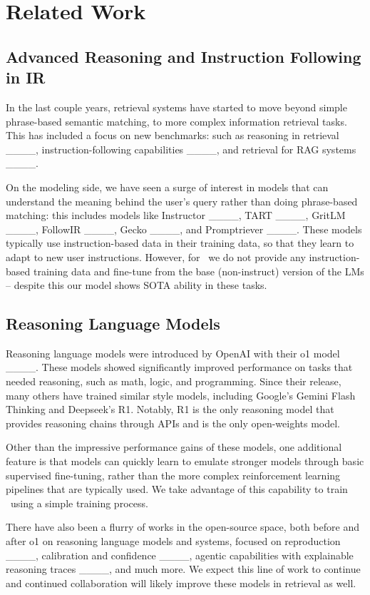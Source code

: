 \section{Related Work}
\subsection{Advanced Reasoning and Instruction Following in IR}
In the last couple years, retrieval systems have started to move beyond simple phrase-based semantic matching, to more complex information retrieval tasks. This has included a focus on new benchmarks: such as reasoning in retrieval ____, instruction-following capabilities ____, and retrieval for RAG systems ____.

On the modeling side, we have seen a surge of interest in models that can understand the meaning behind the user's query rather than doing phrase-based matching: this includes models like Instructor ____, TART ____, GritLM ____, FollowIR ____, Gecko ____, and Promptriever ____. These models typically use instruction-based data in their training data, so that they learn to adapt to new user instructions. However, for \modelnamepretty\ we do not provide any instruction-based training data and fine-tune from the base (non-instruct) version of the LMs -- despite this our model shows SOTA ability in these tasks.

\subsection{Reasoning Language Models}
Reasoning language models were introduced by OpenAI with their o1 model ____. These models showed significantly improved performance on tasks that needed reasoning, such as math, logic, and programming. Since their release, many others have trained similar style models, including Google's Gemini Flash Thinking and Deepseek's R1. Notably, R1 is the only reasoning model that provides reasoning chains through APIs and is the only open-weights model.

Other than the impressive performance gains of these models, one additional feature is that models can quickly learn to emulate stronger models through basic supervised fine-tuning, rather than the more complex reinforcement learning pipelines that are typically used. We take advantage of this capability to train \modelnamepretty\ using a simple training process.

There have also been a flurry of works in the open-source space, both before and after o1 on reasoning language models and systems, focused on reproduction ____, calibration and confidence ____, agentic capabilities with explainable reasoning traces ____, and much more. We expect this line of work to continue and continued collaboration will likely improve these models in retrieval as well.